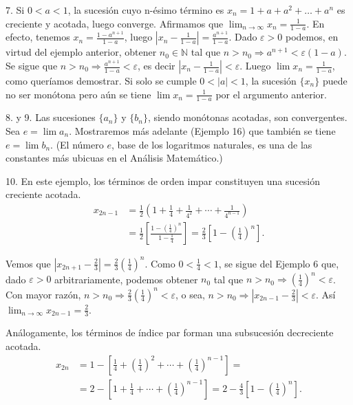 \documentclass[12pt,oneside]{book}
\begin{document}
7. Si \(0 < a < 1\), la sucesión cuyo n-ésimo término es \(x_n = 1 + a + a^2 + \dots + a^n\) es creciente y acotada, luego converge. Afirmamos que \(\lim_{n\to\infty} x_n = \frac{1}{1-a}\). En efecto, tenemos \(x_n = \frac{1 - a^{n+1}}{1 - a}\), luego \(\left|x_n - \frac{1}{1 - a}\right| = \frac{a^{n+1}}{1 - a}\). Dado \(\varepsilon > 0\) podemos, en virtud del ejemplo anterior, obtener \(n_0 \in \mathbb{N}\) tal que \(n > n_0 \Rightarrow a^{n+1} < \varepsilon(1 - a)\). Se sigue que \(n > n_0 \Rightarrow \frac{a^{n+1}}{1 - a} < \varepsilon\), es decir \(\left|x_n - \frac{1}{1 - a}\right| < \varepsilon\). Luego \(\lim x_n = \frac{1}{1 - a}\), como queríamos demostrar. Si solo se cumple \(0 < |a| < 1\), la sucesión \(\{x_n\}\) puede no ser monótona pero aún se tiene \(\lim x_n = \frac{1}{1 - a}\) por el argumento anterior.

8. y 9. Las sucesiones \(\{a_n\}\) y \(\{b_n\}\), siendo monótonas acotadas, son convergentes. Sea \(e = \lim a_n\). Mostraremos más adelante (Ejemplo 16) que también se tiene \(e = \lim b_n\). (El número \(e\), base de los logaritmos naturales, es una de las constantes más ubicuas en el Análisis Matemático.)

10. En este ejemplo, los términos de orden impar constituyen una sucesión creciente acotada.
\begin{align*}
x_{2n-1} &= \frac{1}{2} \left( 1 + \frac{1}{4} + \frac{1}{4^2} + \cdots + \frac{1}{4^{n-1}} \right) \\
&= \frac{1}{2} \left[ \frac{1 - \left(\frac{1}{4}\right)^n}{1 - \frac{1}{4}} \right] = \frac{2}{3} \left[ 1 - \left(\frac{1}{4}\right)^{n} \right].
\end{align*}

Vemos que \(\left|x_{2n+1} - \frac{2}{3}\right| = \frac{2}{3} \left( \frac{1}{4} \right)^n\). Como \(0 < \frac{1}{4} < 1\), se sigue del Ejemplo 6 que, dado \(\varepsilon > 0\) arbitrariamente, podemos obtener \(n_0\) tal que \(n > n_0 \Rightarrow \left( \frac{1}{4} \right)^n < \varepsilon\). Con mayor razón, \(n > n_0 \Rightarrow \frac{2}{3} \left( \frac{1}{4} \right)^n < \varepsilon\), o sea, \(n > n_0 \Rightarrow \left|x_{2n-1} - \frac{2}{3}\right| < \varepsilon\). Así \(\lim_{n \to \infty} x_{2n-1} = \frac{2}{3}\).

Análogamente, los términos de índice par forman una subsucesión decreciente acotada.
\begin{align*}
x_{2n} &= 1 - \left[ \frac{1}{4} + \left( \frac{1}{4} \right)^2 + \cdots + \left( \frac{1}{4} \right)^{n-1} \right] = \\
&= 2 - \left[ 1 + \frac{1}{4} + \cdots + \left( \frac{1}{4} \right)^{n-1} \right] = 2 - \frac{4}{3} \left[ 1 - \left( \frac{1}{4} \right)^n \right].
\end{align*}
\end{document}
